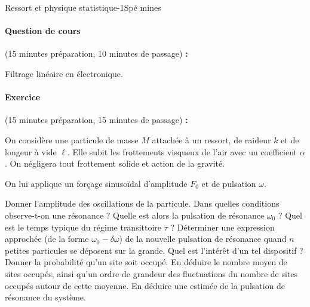 \begin{exercise}{Ressort et physique statistique}{-1}{Spé}
{}{mines}

\paragraph{Question de cours} \textsf{(15 minutes préparation, 10 minutes de passage) \textbf{:}}

Filtrage linéaire en électronique.

\paragraph{Exercice} \textsf{(15 minutes préparation, 15 minutes de passage) \textbf{:}}

On considère une particule de masse $M$ attachée à un ressort, de raideur $k$ et de longeur à vide $\ell$. Elle subit les frottements visqueux de l'air avec un coefficient $\alpha$. On négligera tout frottement solide et action de la gravité.

On lui applique un forçage sinusoïdal d'amplitude $F_0$ et de pulsation $\omega$.

\begin{questions}
    \question Donner l'amplitude des oscillations de la particule. Dans quelles conditions observe-t-on une résonance ? Quelle est alors la pulsation de résonance $\omega_0$ ? Quel est le temps typique du régime transittoire $\tau$ ?
    \question Déterminer une expression approchée (de la forme $\omega_0 - \delta\omega$) de la nouvelle pulsation de résonance quand $n$ petites particules se déposent sur la grande. Quel est l'intérêt d'un tel dispositif ?
    \question Donner la probabilité qu'un site soit occupé. En déduire le nombre moyen de sites occupés, ainsi qu'un ordre de grandeur des fluctuations du nombre de sites occupés autour de cette moyenne.
    \question En déduire une estimée de la pulsation de résonance du système.

\end{questions}

\end{exercise}
